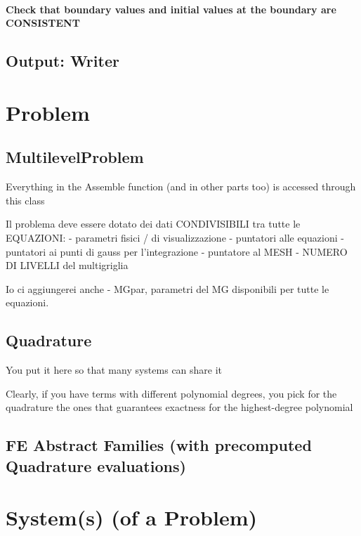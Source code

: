\documentclass[10pt]{book}
\begin{document}
  \subsubsection{Check that boundary values and initial values at the boundary are CONSISTENT}

  
  \section{Output: Writer}

  
  \chapter{Problem}

  
    \section{MultilevelProblem}

  Everything in the Assemble function (and in other parts too) is accessed through this class
  
Il problema deve essere dotato dei dati CONDIVISIBILI tra tutte le EQUAZIONI:
   - parametri fisici / di visualizzazione
   - puntatori alle equazioni
   - puntatori ai punti di gauss per l'integrazione
   - puntatore al MESH
   - NUMERO DI LIVELLI del multigriglia

Io ci aggiungerei anche 
   - MGpar, parametri del MG disponibili per tutte le equazioni.
   
\section{ Quadrature }

You put it here so that many systems can share it

Clearly, if you have terms with different polynomial degrees,
you pick for the quadrature the ones that guarantees exactness for the highest-degree polynomial
  
\section{FE Abstract Families (with precomputed Quadrature evaluations)}
  
  \chapter{System(s) (of a Problem)}
\end{document}
